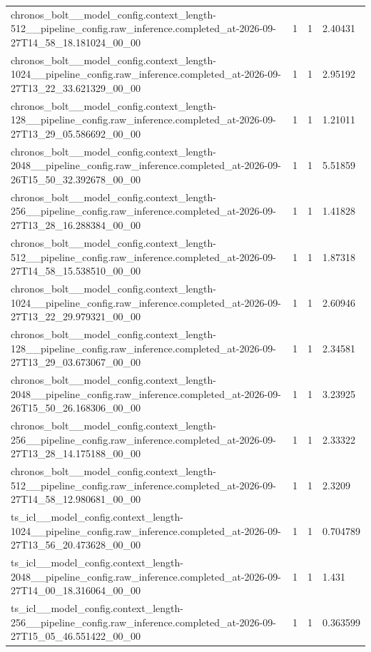 \begin{tabular}{llll}
chronos\_bolt\_\_model\_config.context\_length-512\_\_pipeline\_config.raw\_inference.completed\_at-2026-09-27T14\_58\_18.181024\_00\_00 & 1 & 1 & 2.40431 \\
chronos\_bolt\_\_model\_config.context\_length-1024\_\_pipeline\_config.raw\_inference.completed\_at-2026-09-27T13\_22\_33.621329\_00\_00 & 1 & 1 & 2.95192 \\
chronos\_bolt\_\_model\_config.context\_length-128\_\_pipeline\_config.raw\_inference.completed\_at-2026-09-27T13\_29\_05.586692\_00\_00 & 1 & 1 & 1.21011 \\
chronos\_bolt\_\_model\_config.context\_length-2048\_\_pipeline\_config.raw\_inference.completed\_at-2026-09-26T15\_50\_32.392678\_00\_00 & 1 & 1 & 5.51859 \\
chronos\_bolt\_\_model\_config.context\_length-256\_\_pipeline\_config.raw\_inference.completed\_at-2026-09-27T13\_28\_16.288384\_00\_00 & 1 & 1 & 1.41828 \\
chronos\_bolt\_\_model\_config.context\_length-512\_\_pipeline\_config.raw\_inference.completed\_at-2026-09-27T14\_58\_15.538510\_00\_00 & 1 & 1 & 1.87318 \\
chronos\_bolt\_\_model\_config.context\_length-1024\_\_pipeline\_config.raw\_inference.completed\_at-2026-09-27T13\_22\_29.979321\_00\_00 & 1 & 1 & 2.60946 \\
chronos\_bolt\_\_model\_config.context\_length-128\_\_pipeline\_config.raw\_inference.completed\_at-2026-09-27T13\_29\_03.673067\_00\_00 & 1 & 1 & 2.34581 \\
chronos\_bolt\_\_model\_config.context\_length-2048\_\_pipeline\_config.raw\_inference.completed\_at-2026-09-26T15\_50\_26.168306\_00\_00 & 1 & 1 & 3.23925 \\
chronos\_bolt\_\_model\_config.context\_length-256\_\_pipeline\_config.raw\_inference.completed\_at-2026-09-27T13\_28\_14.175188\_00\_00 & 1 & 1 & 2.33322 \\
chronos\_bolt\_\_model\_config.context\_length-512\_\_pipeline\_config.raw\_inference.completed\_at-2026-09-27T14\_58\_12.980681\_00\_00 & 1 & 1 & 2.3209 \\
ts\_icl\_\_model\_config.context\_length-1024\_\_pipeline\_config.raw\_inference.completed\_at-2026-09-27T13\_56\_20.473628\_00\_00 & 1 & 1 & 0.704789 \\
ts\_icl\_\_model\_config.context\_length-2048\_\_pipeline\_config.raw\_inference.completed\_at-2026-09-27T14\_00\_18.316064\_00\_00 & 1 & 1 & 1.431 \\
ts\_icl\_\_model\_config.context\_length-256\_\_pipeline\_config.raw\_inference.completed\_at-2026-09-27T15\_05\_46.551422\_00\_00 & 1 & 1 & 0.363599 \\

\end{tabular}
